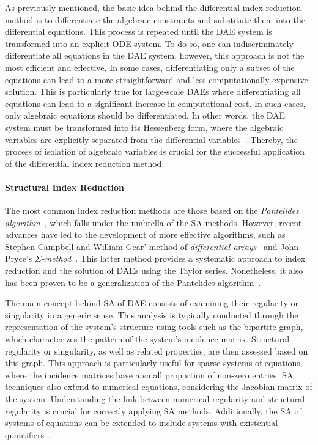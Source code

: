 As previously mentioned, the basic idea behind the differential index reduction method is to differentiate the algebraic constraints and substitute them into the differential equations. This process is repeated until the \ac{DAE} system is transformed into an explicit \ac{ODE} system. To do so, one can indiscriminately differentiate all equations in the \ac{DAE} system, however, this approach is not the most efficient and effective. In some cases, differentiating only a subset of the equations can lead to a more straightforward and less computationally expensive solution. This is particularly true for large-scale \acp{DAE} where differentiating all equations can lead to a significant increase in computational cost. In such cases, only algebraic equations should be differentiated. In other words, the \ac{DAE} system must be transformed into its Hessenberg form, where the algebraic variables are explicitly separated from the differential variables~\cite{shmoylova2013simplification}. Thereby, the process of isolation of algebraic variables is crucial for the successful application of the differential index reduction method.

\paragraph{Structural Index Reduction}

The most common index reduction methods are those based on the \emph{Pantelides algorithm}~\cite{pantelides1988consistent}, which falls under the umbrella of the \ac{SA} methods. However, recent advances have led to the development of more effective algorithms, such as Stephen Campbell and William Gear' method of \emph{differential arrays}~\cite{campbell1995index} and John Pryce's \emph{$\Sigma$-method}~\cite{pryce1998solving}. This latter method provides a systematic approach to index reduction and the solution of \acp{DAE} using the Taylor series. Nonetheless, it also has been proven to be a generalization of the Pantelides algorithm~\cite{pryce2001simple}.

The main concept behind \ac{SA} of \ac{DAE} consists of examining their regularity or singularity in a generic sense. This analysis is typically conducted through the representation of the system's structure using tools such as the bipartite graph, which characterizes the pattern of the system's incidence matrix. Structural regularity or singularity, as well as related properties, are then assessed based on this graph. This approach is particularly useful for sparse systems of equations, where the incidence matrices have a small proportion of non-zero entries. \ac{SA} techniques also extend to numerical equations, considering the Jacobian matrix of the system. Understanding the link between numerical regularity and structural regularity is crucial for correctly applying \ac{SA} methods. Additionally, the \ac{SA} of systems of equations can be extended to include systems with existential quantifiers~\cite{benveniste2021structural}.

